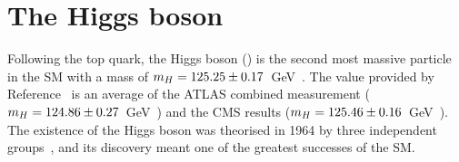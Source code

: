 \begin{comment}
For the charged weak current only the only the left-handed top couples to the \PWpm with coupling. This is done
via the \Wtb vertex with a strength of $g\gamma^{\mu}(1-\gamma^{5})V_{tb}$ (Figure
\ref{fig:Chap1:TopPhys:Couplings:W}). The value of $V_{tb}$ is given in Table~\ref{tab:Chap1:CKM}.
The top couples to the \PZ bosons (Figure~\ref{fig:Chap1:TopPhys:Couplings:Z})with unequal left and right-handed components, 
$\frac{ig}{2\textrm{cos}\,\theta_{W}}\gamma^{\mu}(v_{t}-a_{t}\gamma^{5})$. Being $v_{t} =1/2 -2Q_{t} \textrm{sin}^{2}\theta_{W}$ 
and $a_{t} = 1/2$.
Finally, for the Higgs boson (Figure~\ref{fig:Chap1:TopPhys:Couplings:H}), the top 
quark couples with a Yukawa type interaction $\bar{\Psi}\Psi \phi$ with a strength 
$\yt = \frac{\sqrt{2}\mtop}{v}$, as equation~\ref{eq:chap1:HiggsMechanism:YukawaCoupling} states. 
All of these couplings are flavour-conserving, with the exception of the charged-current
interaction with the \PW bosons. 

\end{comment}


\section{The Higgs boson}
\label{sec:Chap1:HiggsBoson}
Following the top quark, the Higgs boson (\PH)
is the second most massive particle in the SM with a mass of
$m_{H} = 125.25 \pm 0.17$~GeV~\cite{Workman:2022ynf}. The value provided by Reference~\cite{Workman:2022ynf} is an average
of the ATLAS combined measurement ($m_{H} = 124.86 \pm 0.27$~GeV~\cite{ATLAS:2018tdk}) 
and the CMS results ($m_{H} = 125.46 \pm 0.16$~GeV~\cite{CMS:2020xrn}). %
The existence of the Higgs boson was theorised in 1964 by three independent groups~\cite{PhysRevLett.13.321, PhysRevLett.13.508, PhysRevLett.13.585}, and its discovery meant one of the greatest successes of the SM. 

